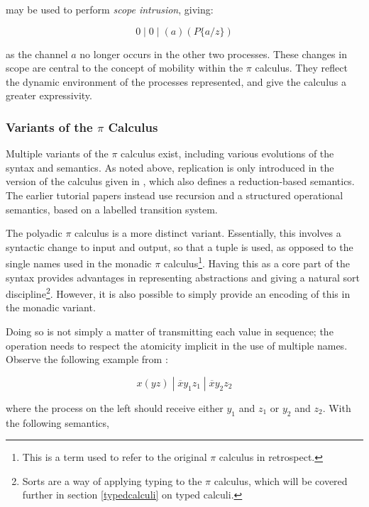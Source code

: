 \noindent may be used to perform \emph{scope intrusion}, giving:

\begin{equation}
0\;|\;0\;|\;(a)(P\{a/z\})
\end{equation}

\noindent as the channel $a$ no longer occurs in the other two
processes.  These changes in scope are central to the concept of
mobility within the $\pi$ calculus.  They reflect the dynamic
environment of the processes represented, and give the calculus a
greater expressivity.

\subsubsection{Variants of the $\pi$ Calculus}
\label{pivariants}

Multiple variants of the $\pi$ calculus exist, including various
evolutions of the syntax and semantics.  As noted above, replication
is only introduced in the version of the calculus given in
\cite{funcproc}, which also defines a reduction-based semantics.  The
earlier tutorial papers \cite{picalctutorial} instead use recursion
and a structured operational semantics, based on a labelled transition
system.

The polyadic $\pi$ calculus \cite{milner:93polyadic} is a more
distinct variant.  Essentially, this involves a syntactic change to
input and output, so that a tuple is used, as opposed to the single
names used in the monadic $\pi$ calculus\footnote{This is a term used
  to refer to the original $\pi$ calculus in retrospect.}.  Having
this as a core part of the syntax provides advantages in representing
abstractions and giving a natural sort discipline\footnote{Sorts are a
  way of applying typing to the $\pi$ calculus, which will be covered
  further in section \ref{typedcalculi} on typed calculi.}.  However,
it is also possible to simply provide an encoding of this in the
monadic variant.

Doing so is not simply a matter of transmitting each value in
sequence; the operation needs to respect the atomicity implicit in the
use of multiple names.  Observe the following example from
\cite{milner:93polyadic}:

\begin{equation}
x(yz)\;|\;\overline{x}y_1z_1\;|\;\overline{x}y_2z_2
\end{equation}

\noindent where the process on the left should receive either $y_1$ and
$z_1$ or $y_2$ and $z_2$.  With the following semantics,

